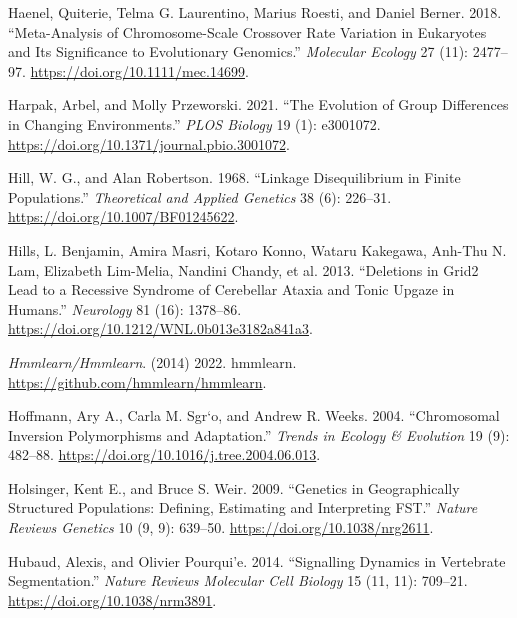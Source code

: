 \documentclass[
]{book}
\newlength{\cslhangindent}
\newlength{\cslentryspacingunit} %
\newenvironment{CSLReferences}[2] %
 {%
  \setlength{\parindent}{0pt}
  \ifodd #1
  \let\oldpar\par
  \def\par{\hangindent=\cslhangindent\oldpar}
  \fi
  \setlength{\parskip}{#2\cslentryspacingunit}
 }%
 {}
\begin{document}
\begin{CSLReferences}{1}{0}
\leavevmode{}%
Haenel, Quiterie, Telma G. Laurentino, Marius Roesti, and Daniel Berner. 2018. {``Meta-Analysis of Chromosome-Scale Crossover Rate Variation in Eukaryotes and Its Significance to Evolutionary Genomics.''} \emph{Molecular Ecology} 27 (11): 2477--97. \url{https://doi.org/10.1111/mec.14699}.

\leavevmode{}%
Harpak, Arbel, and Molly Przeworski. 2021. {``The Evolution of Group Differences in Changing Environments.''} \emph{PLOS Biology} 19 (1): e3001072. \url{https://doi.org/10.1371/journal.pbio.3001072}.

\leavevmode{}%
Hill, W. G., and Alan Robertson. 1968. {``Linkage Disequilibrium in Finite Populations.''} \emph{Theoretical and Applied Genetics} 38 (6): 226--31. \url{https://doi.org/10.1007/BF01245622}.

\leavevmode{}%
Hills, L. Benjamin, Amira Masri, Kotaro Konno, Wataru Kakegawa, Anh-Thu N. Lam, Elizabeth Lim-Melia, Nandini Chandy, et al. 2013. {``Deletions in {Grid2} Lead to a Recessive Syndrome of Cerebellar Ataxia and Tonic Upgaze in Humans.''} \emph{Neurology} 81 (16): 1378--86. \url{https://doi.org/10.1212/WNL.0b013e3182a841a3}.

\leavevmode{}%
\emph{Hmmlearn/Hmmlearn}. (2014) 2022. {hmmlearn}. \url{https://github.com/hmmlearn/hmmlearn}.

\leavevmode{}%
Hoffmann, Ary A., Carla M. Sgr`o, and Andrew R. Weeks. 2004. {``Chromosomal Inversion Polymorphisms and Adaptation.''} \emph{Trends in Ecology \& Evolution} 19 (9): 482--88. \url{https://doi.org/10.1016/j.tree.2004.06.013}.

\leavevmode{}%
Holsinger, Kent E., and Bruce S. Weir. 2009. {``Genetics in Geographically Structured Populations: Defining, Estimating and Interpreting {FST}.''} \emph{Nature Reviews Genetics} 10 (9, 9): 639--50. \url{https://doi.org/10.1038/nrg2611}.

\leavevmode{}%
Hubaud, Alexis, and Olivier Pourqui'e. 2014. {``Signalling Dynamics in Vertebrate Segmentation.''} \emph{Nature Reviews Molecular Cell Biology} 15 (11, 11): 709--21. \url{https://doi.org/10.1038/nrm3891}.


\end{CSLReferences}
\end{document}

